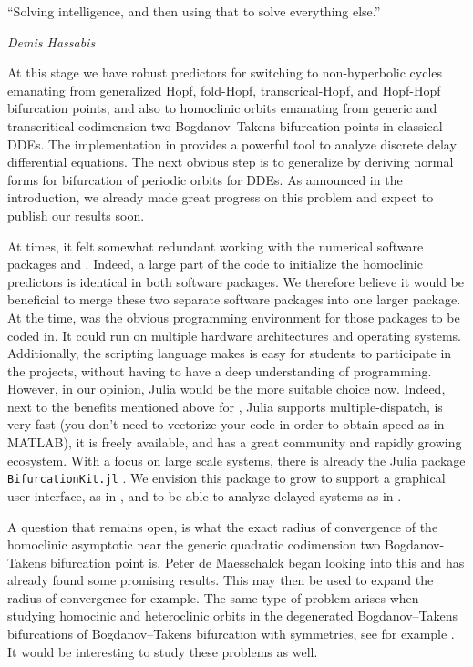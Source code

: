 \epigraph{ ``Solving intelligence, and then using that to solve everything
else.''}{{\it Demis Hassabis}}
At this stage we have robust predictors for switching to  non-hyperbolic cycles
emanating from generalized Hopf, fold-Hopf, transcrical-Hopf, and Hopf-Hopf
bifurcation points, and also to homoclinic orbits emanating from generic and
transcritical codimension two Bogdanov--Takens bifurcation points in classical
DDEs. The implementation in \DDEBIFTOOL provides a powerful tool to analyze
discrete delay differential equations. The next obvious step is to generalize
\cite{Kuznetsov2005,DeWitte2013,DeWitte2014} by deriving normal forms for
bifurcation of periodic orbits for DDEs. As announced in the introduction, we
already made great progress on this problem and expect to publish our results
soon.

At times, it felt somewhat redundant working with the numerical software packages
\DDEBIFTOOL and \MATCONT. Indeed, a large part of the code to initialize the
homoclinic predictors is identical in both software packages. We therefore
believe it would be beneficial to merge these two separate software packages into
one larger package. At the time, \MATLAB was the obvious programming environment
for those packages to be coded in. It could run on multiple hardware
architectures and operating systems. Additionally, the scripting language makes
is easy for students to participate in the projects, without having to have a
deep understanding of programming. However, in our opinion, Julia would be the
more suitable choice now. Indeed, next to the benefits mentioned above for
\MATLAB, Julia supports multiple-dispatch, is very fast (you don't need to
vectorize your code in order to obtain speed as in MATLAB), it is freely
available, and has a great community and rapidly growing ecosystem. With a focus
on large scale systems, there is already the Julia package
\texttt{BifurcationKit.jl} \cite{veltz:hal-02902346}. We
envision this package to grow to support a graphical user interface, as in
\MATCONT, and to be able to analyze delayed systems as in \DDEBIFTOOL.

A question that remains open, is what the exact radius of convergence of the
homoclinic asymptotic near the generic quadratic codimension two Bogdanov-Takens
bifurcation  point is. Peter de Maesschalck began looking into this and has
already found some promising results. This may then be used to expand the radius
of convergence for example. The same type of problem arises when studying
homocinic and heteroclinic orbits in the degenerated Bogdanov--Takens
bifurcations of Bogdanov--Takens bifurcation with symmetries, see for example
\cite{chow_li_wang_1994}. It would be interesting to study these problems as
well. 

